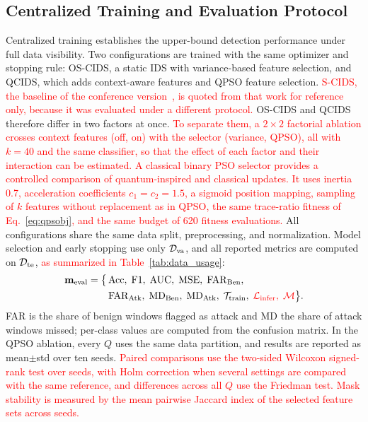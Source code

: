 \documentclass[conference]{IEEEtran}
\begin{document}
\subsection{Centralized Training and Evaluation Protocol}
\label{subsec:centralized_method}
Centralized training establishes the upper-bound detection
performance under full data visibility. 
Two configurations are trained with the same optimizer and stopping
rule: OS-CIDS, a static IDS with variance-based feature selection,
and QCIDS, which adds context-aware features and QPSO feature
selection. \textcolor{red}{S-CIDS, the baseline of the conference
version~\cite{ajakweconquest}, is quoted from that work for reference
only, because it was evaluated under a different protocol.}
OS-CIDS and QCIDS therefore differ in two factors at once.
\textcolor{red}{To separate them, a $2\times2$ factorial
ablation crosses context features (off, on) with the selector
(variance, QPSO), all with $k=40$ and the same classifier, so that the
effect of each factor and their interaction can be estimated. A
classical binary PSO selector provides a controlled comparison of
quantum-inspired and classical updates. It uses inertia 0.7,
acceleration coefficients $c_1=c_2=1.5$, a sigmoid position mapping,
sampling of $k$ features without replacement as in QPSO, the same trace-ratio fitness of Eq.~\eqref{eq:qpsobj}, and the
same budget of 620 fitness evaluations.} All configurations share
the same data split, preprocessing, and normalization. Model
selection and early stopping use only $\mathcal{D}_{\rm va}$, and all
reported metrics are computed on $\mathcal{D}_{\rm te}$,
\textcolor{red}{as summarized in Table~\ref{tab:data_usage}}:
\begin{align}
\mathbf{m}_{\rm eval} = \bigl\{
&\,\mathrm{Acc},\;\mathrm{F1},\;\mathrm{AUC},\;\mathrm{MSE},\;
  \mathrm{FAR}_{\rm Ben},\nonumber\\
&\,\mathrm{FAR}_{\rm Atk},\;\mathrm{MD}_{\rm Ben},\;
  \mathrm{MD}_{\rm Atk},\;
  \mathcal{T}_{\rm train},\;\textcolor{red}{\mathcal{L}_{\rm infer},\;\mathcal{M}}
\bigr\}.
\label{eq:central_metrics}
\end{align}
FAR is the share of benign windows flagged as attack and MD the share
of attack windows missed; per-class values are computed from the confusion
matrix. In the
QPSO ablation, every $Q$ uses the same data partition, and results
are reported as mean$\pm$std over ten seeds.
\textcolor{red}{Paired comparisons use the two-sided
Wilcoxon signed-rank test over seeds, with Holm correction when
several settings are compared with the same reference, and
differences across all $Q$ use the Friedman test. Mask stability is
measured by the mean pairwise Jaccard index of the selected feature
sets across seeds.}
\end{document}
